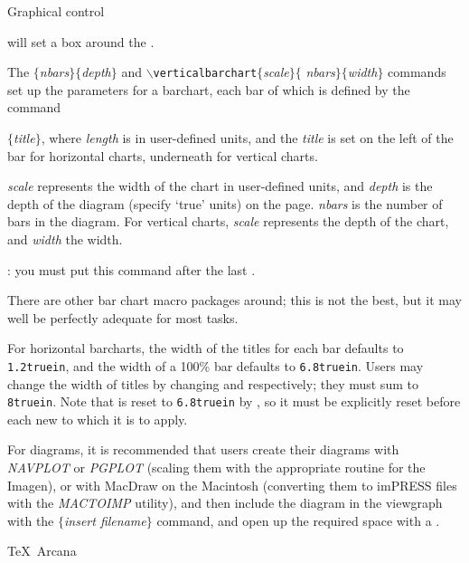 \standardlines{}

\filbreak Graphical control

\incindent\shortlines

 will set a box around the .

The $\{${\it nbars}$\}\{${\it depth}$\}$ and
{\tt$\backslash$verticalbarchart}\-$\{${\it scale}$\}$\-$\{${\it
nbars}$\}\{${\it width}$\}$ commands set up the parameters for a barchart, each
bar of which is defined by the command 

\incindent

$\{${\it title}$\}$, where {\it length} is in
user-defined units, and the {\it title} is set on the left of the bar for
horizontal charts, underneath for vertical charts.

{\it scale} represents the width of the chart in user-defined units, and
{\it depth} is the depth of the diagram (specify `true' units) on the page. 
{\it nbars} is the number of bars in the diagram.  For vertical charts,
{\it scale} represents the depth of the chart, and {\it width} the width.

: you must put this command after the last .

There are other bar chart macro packages around; this is not the best, but
it may well be perfectly adequate for most tasks.

For horizontal barcharts, the width of the titles for each bar defaults
to {\tt 1.2truein}, and the width of a 100\% bar defaults to {\tt 6.8truein}.
Users may change the width of titles by changing 
and  respectively; they must sum to {\tt 8truein}.  Note
that  is reset to {\tt 6.8truein} by ,
so it must be explicitly reset before each new 
to which it is to apply.


\filbreak 
For diagrams, it is recommended that users create their diagrams with {\sl
NAVPLOT} or {\sl PGPLOT} (scaling them with the appropriate routine for the
Imagen), or with MacDraw on the Macintosh (converting them to imPRESS files
with the {\sl MACTOIMP} utility), and then include the diagram in the viewgraph
with the $\{${\it insert filename}$\}$ command, and open up the
required space with a . 


\TeX\ Arcana

